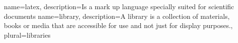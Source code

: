 \makeglossaries

{
        name=latex,
        description={Is a mark up language specially suited for
scientific documents}
}
{
        name=library,
        description={A library is a collection of materials, books or media that are accessible for use and not just for display purposes.},
        plural={libraries}
}
